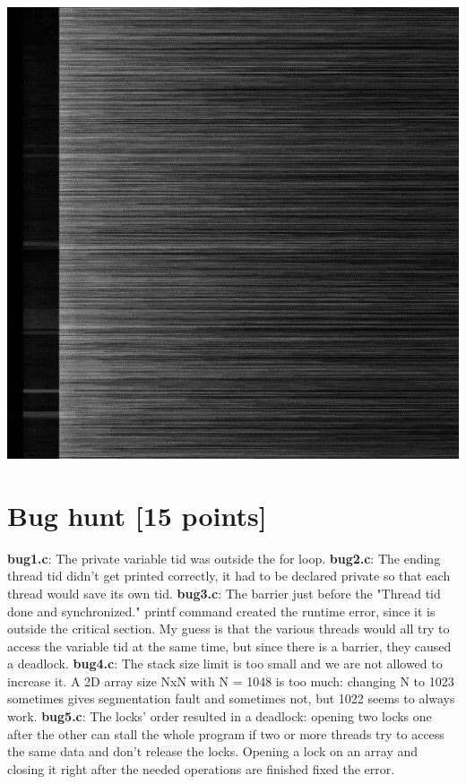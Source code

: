 \documentclass[unicode,11pt,a4paper,oneside,numbers=endperiod,openany]{scrartcl}
\begin{document}
\begin{center}
\includegraphics[width=0.7\linewidth]{mandelomp.png}
\end{center}

\section{Bug hunt [15 points]}

\textbf{bug1.c}: The private variable tid was outside the for loop.
\newline
\textbf{bug2.c}: The ending thread tid didn't get printed correctly, it had to be declared private so that each thread would save its own tid.
\newline
\textbf{bug3.c}: The barrier just before the "Thread tid done and synchronized." printf command created the runtime error, since it is outside the critical section. My guess is that the various threads would all try to access the variable tid at the same time, but since there is a barrier, they caused a deadlock.
\newline
\textbf{bug4.c}: The stack size limit is too small and we are not allowed to increase it. A 2D array size NxN with N = 1048 is too much: changing N to 1023 sometimes gives segmentation fault and sometimes not, but 1022 seems to always work.
\newline
\textbf{bug5.c}: The locks' order resulted in a deadlock: opening two locks one after the other can stall the whole program if two or more threads try to access the same data and don't release the locks. Opening a lock on an array and closing it right after the needed operations are finished fixed the error.
\end{document}
